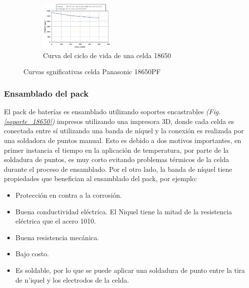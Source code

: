 \documentclass[10pt, a4paper]{article}
\begin{document}
\begin{figure}[h!]
\begin{centering}
	\begin{subfigure}[t]{1\textwidth}
	    \centering
	    \includegraphics[width=0.4\textwidth]{life_cycle_18650.png}
	    \caption{Curva del ciclo de vida de una celda 18650}
        \label{life_cycle_18650}
	\end{subfigure}
    \end{centering}
    \caption{Curvas sgnificativas celda Panasonic 18650PF}
    \label{curvas_sign_18650}
\end{figure}

\newpage

\subsubsection{Ensamblado del pack}

El pack de bater\'ias es ensamblado utilizando soportes encastrables \emph{(Fig.
\ref{soporte_18650})} impresos utilizando una impresora 3D, donde cada celda es
conectada entre s\'i utilizando una banda de níquel y la conexi\'on es realizada 
por una soldadora de puntos manual. Esto es debido a dos motivos importantes, en 
primer instancia el tiempo en la aplicaci\'on de temperatura, por parte de la 
soldadura de puntos, es muy corto evitando problemas t\'ermicos de la celda 
durante el proceso de ensamblado. Por el otro lado, la banda de níquel tiene 
propiedades que benefician al ensamblado del pack, por ejemplo:

\begin{itemize}
    \item Protecci\'on en contra a la corrosi\'on.
    \item Buena conductividad el\'ectrica. El Niquel tiene la mitad de la
        resistencia el\'ectrica que el acero 1010.
    \item Buena resistencia mec\'anica.
    \item Bajo costo.
    \item Es soldable, por lo que se puede aplicar una soldadura de punto entre
        la tira de n'iquel y los electrodos de la celda.
\end{itemize}
\end{document}
